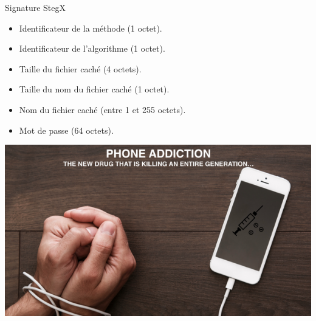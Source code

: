 \documentclass{beamer}
\begin{document}
  
  \begin{frame}
  
  \begin{block}{Signature StegX}
	\begin{itemize}
	[circle]
	\item Identificateur de la méthode (1 octet).
	\item Identificateur de l'algorithme (1 octet). 
	\item Taille du fichier caché (4 octets). 
	\item Taille du nom du fichier caché (1 octet). 
	\item Nom du fichier caché (entre 1 et 255 octets). 
	\item Mot de passe (64 octets).  
	\end{itemize}
	\end{block}
  
  \includegraphics[scale=0.55]{ANGS3/addiction.png}
  \end{frame}
  
\end{document}
